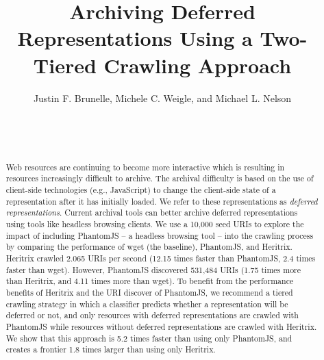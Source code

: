 \documentclass{ipres_proc_article-sp}
\begin{document}
\title{Archiving Deferred Representations Using a Two-Tiered Crawling Approach}


\author{
\alignauthor
Justin F. Brunelle, Michele C. Weigle, and Michael L. Nelson\\
       \\
       \\
       \\
}

\maketitle
\begin{abstract}
Web resources are continuing to become more interactive which is resulting in resources increasingly difficult to archive. The archival difficulty is based on the use of client-side technologies (e.g., JavaScript) to change the client-side state of a representation after it has initially loaded. We refer to these representations as \emph{deferred representations}. Current archival tools can better archive deferred representations using tools like headless browsing clients. 
We use a 10,000 seed URIs to explore the impact of including PhantomJS -- a headless browsing tool -- into the crawling process by comparing the performance of wget (the baseline), PhantomJS, and Heritrix. Heritrix crawled 2.065 URIs per second (12.15 times faster than PhantomJS, 2.4 times faster than wget). However, PhantomJS discovered 531,484 URIs (1.75 times more than Heritrix, and 4.11 times more than wget). To benefit from the performance benefits of Heritrix and the URI discover of PhantomJS, we recommend a tiered crawling strategy in which a classifier predicts whether a representation will be deferred or not, and only resources with deferred representations are crawled with PhantomJS while resources without deferred representations are crawled with Heritrix. We show that this approach is 5.2 times faster than using only PhantomJS, and creates a frontier 1.8 times larger than using only Heritrix.
\end{abstract}

\end{document}
